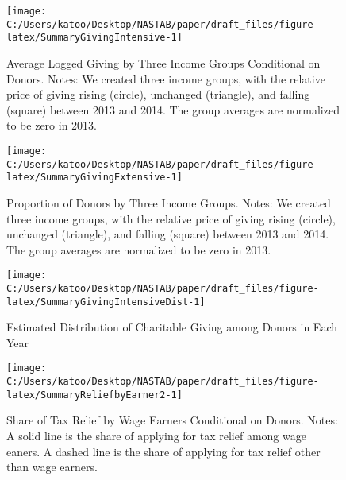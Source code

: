\documentclass[
  11pt,
  a4paper,
]{article}
\begin{document}
\begin{figure}[H]

{\centering \texttt{[image: C:/Users/katoo/Desktop/NASTAB/paper/draft\_files/figure-latex/SummaryGivingIntensive-1]} 

}

\caption{Average Logged Giving by Three Income Groups Conditional on Donors. Notes: We created three income groups, with the relative price of giving rising (circle), unchanged (triangle), and falling (square) between 2013 and 2014. The group averages are normalized to be zero in 2013.}\label{fig:SummaryGivingIntensive}
\end{figure}

\begin{figure}[H]

{\centering \texttt{[image: C:/Users/katoo/Desktop/NASTAB/paper/draft\_files/figure-latex/SummaryGivingExtensive-1]} 

}

\caption{Proportion of Donors by Three Income Groups. Notes: We created three income groups, with the relative price of giving rising (circle), unchanged (triangle), and falling (square) between 2013 and 2014. The group averages are normalized to be zero in 2013.}\label{fig:SummaryGivingExtensive}
\end{figure}

\begin{figure}[H]

{\centering \texttt{[image: C:/Users/katoo/Desktop/NASTAB/paper/draft\_files/figure-latex/SummaryGivingIntensiveDist-1]} 

}

\caption{Estimated Distribution of Charitable Giving among Donors in Each Year}\label{fig:SummaryGivingIntensiveDist}
\end{figure}

\begin{figure}[H]

{\centering \texttt{[image: C:/Users/katoo/Desktop/NASTAB/paper/draft\_files/figure-latex/SummaryReliefbyEarner2-1]} 

}

\caption{Share of Tax Relief by Wage Earners Conditional on Donors. Notes: A solid line is the share of applying for tax relief among wage eaners. A dashed line is the share of applying for tax relief other than wage earners.}\label{fig:SummaryReliefbyEarner2}
\end{figure}
\end{document}
